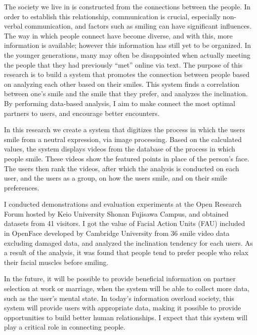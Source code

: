 \begin{eabstract}


  The society we live in is constructed from the connections between the people.
  In order to establish this relationship, communication is crucial, especially non-verbal communication,
  and factors such as smiling can have significant influences.
  The way in which people connect have become diverse, and with this, more information is available;
  however this information has still yet to be organized.
  In the younger generations,
  many may often be disappointed when actually meeting the people that they had previously “met” online via text.
  The purpose of this research is to build a system that promotes the connection between people based on analyzing each other based on their smiles.
  This system finds a correlation between one’s smile and the smile that they prefer, and analyzes the inclination.
  By performing data-based analysis, I aim to make connect the most optimal partners to users, and encourage better encounters.

  In this research we create a system that digitizes the process in which the users smile from a neutral expression, via image processing.
  Based on the calculated values,
  the system displays videos from the database of the process in which people smile.
  These videos show the featured points in place of the person’s face.
  The users then rank the videos, after which the analysis is conducted on each user,
  and the users as a group, on how the users smile, and on their smile preferences.

  I conducted demonstrations and evaluation experiments at the Open Research Forum hosted by Keio University Shonan Fujisawa Campus,
  and obtained datasets from 41 visitors.
  I got the value of Facial Action Units (FAU) included in OpenFace developed by Cambridge University from 36 smile video data excluding damaged data,
  and analyzed the inclination tendency for each users.
  As a result of the analysis, it was found that people tend to prefer people who relax their facial muscles before smiling.

  In the future, it will be possible to provide beneficial information on partner selection at work or marriage,
  when the system will be able to collect more data, such as the user’s mental state.
  In today’s information overload society, this system will provide users with appropriate data,
  making it possible to provide opportunities to build better human relationships.
  I expect that this system will play a critical role in connecting people.

\end{eabstract}

